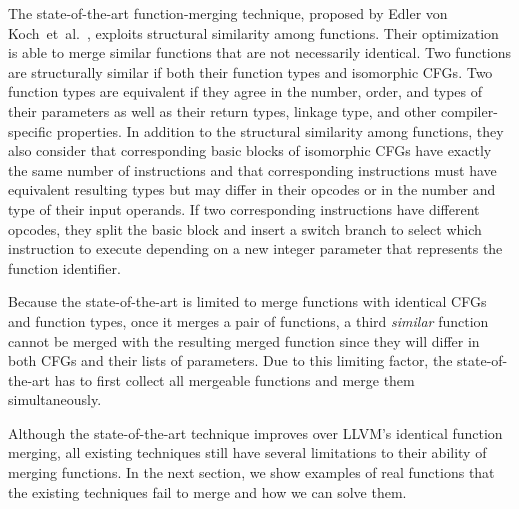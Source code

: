 The state-of-the-art function-merging technique, proposed by Edler von
Koch~et~al.~\cite{edler14}, exploits structural similarity among functions.
Their optimization is able to merge similar functions that are not necessarily
identical.
Two functions are structurally similar if both their function types and
isomorphic CFGs.
Two function types are equivalent
if they agree in the number, order, and types of their parameters as well as
their return types, linkage type, and other compiler-specific properties.
In addition to the structural similarity among functions, they also consider
that corresponding basic blocks of isomorphic CFGs have exactly the same number
of instructions and that corresponding instructions must have equivalent
resulting types but may differ in their opcodes or in the number and type of
their input operands.
If two corresponding instructions have different opcodes, they split the basic
block and insert a switch branch to select which instruction to execute
depending on a new integer parameter that represents the function identifier.

Because the state-of-the-art is limited to merge functions with identical CFGs
and function types, once it merges a pair of functions, a third
\textit{similar} function cannot be merged with the resulting merged function
since they will differ in both CFGs and their lists of parameters.
Due to this limiting factor, the state-of-the-art has to first collect all
mergeable functions and merge them simultaneously.

Although the state-of-the-art technique improves over LLVM's identical
function merging, all existing techniques still have several limitations to
their ability of merging functions.
In the next section, we show examples of real functions that the existing
techniques fail to merge and how we can solve them.
